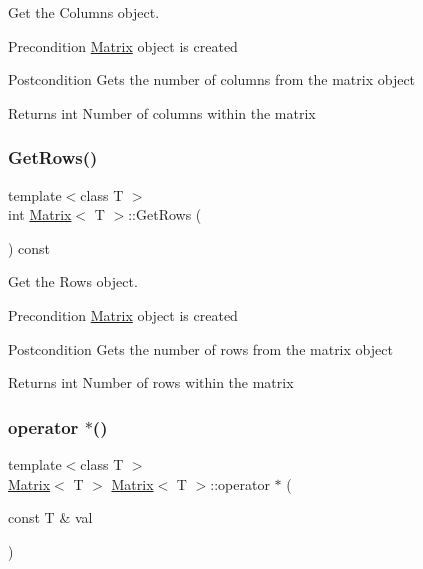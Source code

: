 Get the Columns object. 

\begin{DoxyPrecond}{Precondition}
\mbox{\hyperlink{class_matrix}{Matrix}} object is created 
\end{DoxyPrecond}
\begin{DoxyPostcond}{Postcondition}
Gets the number of columns from the matrix object 
\end{DoxyPostcond}
\begin{DoxyReturn}{Returns}
int Number of columns within the matrix 
\end{DoxyReturn}
\mbox{\label{class_matrix_aa665db4bc173a7bb4ec3f9da2676dfa6}} 
\subsubsection{\texorpdfstring{GetRows()}{GetRows()}}
{\footnotesize\ttfamily template$<$class T $>$ \\
int \mbox{\hyperlink{class_matrix}{Matrix}}$<$ T $>$\+::Get\+Rows (\begin{DoxyParamCaption}{ }\end{DoxyParamCaption}) const}



Get the Rows object. 

\begin{DoxyPrecond}{Precondition}
\mbox{\hyperlink{class_matrix}{Matrix}} object is created 
\end{DoxyPrecond}
\begin{DoxyPostcond}{Postcondition}
Gets the number of rows from the matrix object 
\end{DoxyPostcond}
\begin{DoxyReturn}{Returns}
int Number of rows within the matrix 
\end{DoxyReturn}
\mbox{\label{class_matrix_a7754aef3ca206db6fb054088ba90409f}} 
\subsubsection{\texorpdfstring{operator $\ast$()}{operator *()}}
{\footnotesize\ttfamily template$<$class T $>$ \\
\mbox{\hyperlink{class_matrix}{Matrix}}$<$ T $>$ \mbox{\hyperlink{class_matrix}{Matrix}}$<$ T $>$\+::operator $\ast$ (\begin{DoxyParamCaption}\item[{const T \&}]{val }\end{DoxyParamCaption})}



